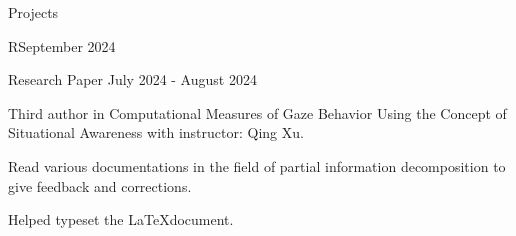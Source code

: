 \documentclass[
	11pt, %
]{resume} %
\begin{document}
\begin{rSection}{Projects}
\begin{rSubsection}{R}{September 2024}{}{}
	\end{rSubsection}
	

	\begin{rSubsection}{Research Paper }{July 2024 - August 2024}{}{}
		\item Third author in Computational Measures of Gaze Behavior Using the Concept of Situational Awareness with instructor: Qing Xu.
		\item Read various documentations in the field of partial information decomposition to give feedback and corrections.
		\item Helped typeset the \LaTeX document.
	\end{rSubsection}
	


	

\end{rSection}



		
	
		
\end{document}
